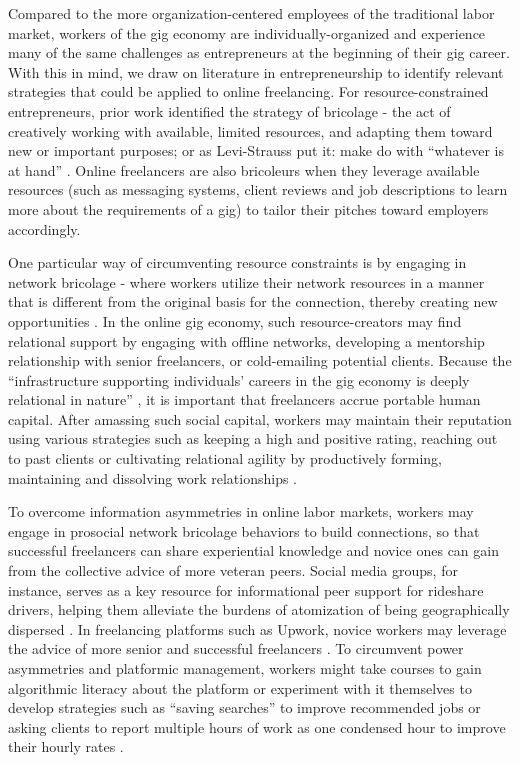 Compared to the more organization-centered employees of the traditional labor market, workers of the gig economy are individually-organized and experience many of the same challenges as entrepreneurs at the beginning of their gig career. With this in mind, we draw on literature in entrepreneurship to identify relevant strategies that could be applied to online freelancing. {For resource-constrained entrepreneurs, prior work} \cite{Busch2021-ls, Vanevenhoven2011-bx, Atarah2021-ox} { identified the strategy of } bricolage - the act of creatively working with available, limited resources, and adapting them toward new or important purposes; or as Levi-Strauss put it: make do with ``whatever is at hand'' \cite{lvi1966savage}. Online freelancers {are} also bricoleurs {when they leverage} available resources (such as messaging systems, {client reviews} and job descriptions to learn more about the requirements of a gig) to tailor their pitches to{ward} employers accordingly. 

One particular way of circumventing resource constraints is by engaging in network bricolage - where workers utilize their network resources in a manner {that is} different from the original basis for the connection, thereby creating new opportunities \cite{Chang2019-ri}. In the online gig economy, such resource-creators may find relational support by engaging with offline networks, developing a mentorship relationship with senior freelancers, or cold-emailing potential clients. Because the ``infrastructure supporting individuals' careers in the gig economy is deeply relational in nature'' \cite{Ashford2018-dw}, it is important that freelancers accrue portable human capital. After amassing such social capital, workers may maintain {their reputation} using various strategies such as keeping a {high and} positive {rating}, reaching out to past clients or cultivating relational agility by productively forming, maintaining and dissolving work relationships \cite{precarity, making}. 

{To overcome information asymmetries in online labor markets, workers may engage in prosocial network bricolage behaviors to build connections, so that successful freelancers can share experiential knowledge and novice ones can gain from the collective advice of more veteran peers. Social media groups, for instance, serves as a key resource for informational peer support for rideshare drivers, helping them alleviate the burdens of atomization of being geographically dispersed \cite{atom}. In freelancing platforms such as Upwork, novice workers may leverage the advice of more senior and successful freelancers \cite{platform_manage}. To circumvent power asymmetries and platformic management, workers might take courses to gain algorithmic literacy about the platform \cite{platform_manage} or experiment with it themselves to develop strategies such as ``saving searches'' to improve recommended jobs or asking clients to report multiple hours of work as one condensed hour to improve their hourly rates \cite{Jarrahi_Sutherland_2019}.}  
    
